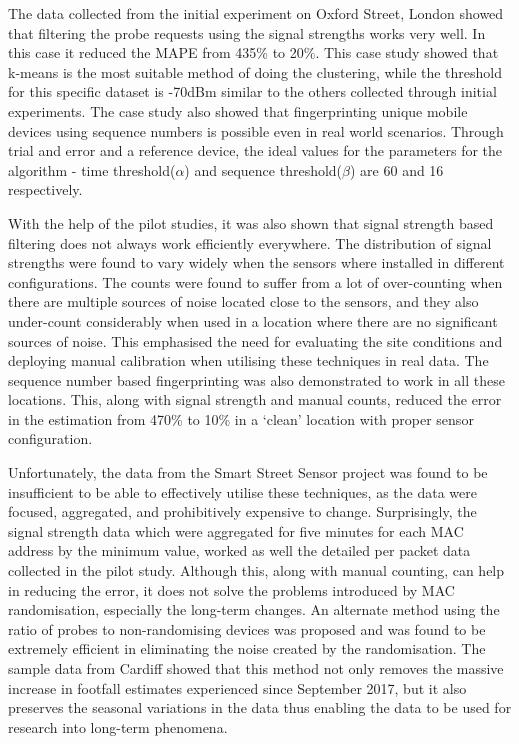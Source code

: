 The data collected from the initial experiment on Oxford Street, London showed that filtering the probe requests using the signal strengths works very well.
In this case it reduced the MAPE from 435\% to 20\%.
This case study showed that k-means is the most suitable method of doing the clustering, while the threshold for this specific dataset is -70dBm similar to the others collected through initial experiments.
The case study also showed that fingerprinting unique mobile devices using sequence numbers is possible even in real world scenarios.
Through trial and error and a reference device, the ideal values for the parameters for the algorithm - time threshold($\alpha$) and sequence threshold($\beta$) are 60 and 16 respectively.

With the help of the pilot studies, it was also shown that signal strength based filtering does not always work efficiently everywhere.
The distribution of signal strengths were found to vary widely when  the sensors where installed in different configurations.
The counts were found to suffer from a lot of over-counting when there are multiple sources of noise located close to the sensors, and they also under-count considerably when used in a location where there are no significant sources of noise.
This emphasised the need for evaluating the site conditions and deploying manual calibration when utilising these techniques in real data.
The sequence number based fingerprinting was also demonstrated to work in all these locations.
This, along with signal strength and manual counts, reduced the error in the estimation from 470\% to 10\% in a ‘clean’ location with proper sensor configuration.

Unfortunately, the data from the Smart Street Sensor project was found to be insufficient to be able to effectively utilise these techniques, as the data were focused, aggregated, and prohibitively expensive to change.
Surprisingly, the signal strength data which were aggregated for five minutes for each MAC address by the minimum value, worked as well the detailed per packet data collected in the pilot study.
Although this, along with manual counting, can help in reducing the error, it does not solve the problems introduced by MAC randomisation, especially the long-term changes.
An alternate method using the ratio of probes to non-randomising devices was proposed and was found to be extremely efficient in eliminating the noise created by the randomisation.
The sample data from Cardiff showed that this method not only removes the massive increase in footfall estimates experienced since September 2017, but it also preserves the seasonal variations in the data thus enabling the data to be used for research into long-term phenomena.
